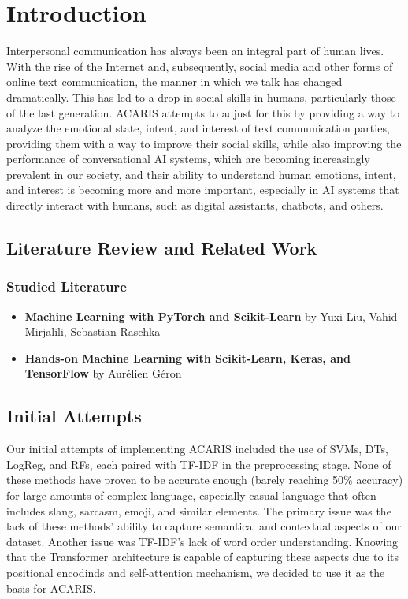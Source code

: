 \documentclass{article}
\begin{document}
\section{Introduction}
Interpersonal communication has always been an integral part of human lives. With the rise of the Internet and, subsequently, social media and other forms of online text communication, the manner in which we talk has changed dramatically. This has led to a drop in social skills in humans, particularly those of the last generation. ACARIS attempts to adjust for this by providing a way to analyze the emotional state, intent, and interest of text communication parties, providing them with a way to improve their social skills, while also improving the performance of conversational AI systems, which are becoming increasingly prevalent in our society, and their ability to understand human emotions, intent, and interest is becoming more and more important, especially in AI systems that directly interact with humans, such as digital assistants, chatbots, and others.

\subsection{Literature Review and Related Work}
\subsubsection{Studied Literature}
\begin{itemize}
	\item \textbf{Machine Learning with PyTorch and Scikit-Learn}\cite{raschka2022machine} by Yuxi Liu, Vahid Mirjalili, Sebastian Raschka
	\item \textbf{Hands-on Machine Learning with Scikit-Learn, Keras, and TensorFlow}\cite{geron2022hands} by Aurélien Géron
\end{itemize}

\subsection{Initial Attempts}
Our initial attempts of implementing ACARIS included the use of SVMs, DTs, LogReg, and RFs, each paired with TF-IDF in the preprocessing stage. None of these methods have proven to be accurate enough (barely reaching 50\% accuracy) for large amounts of complex language, especially casual language that often includes slang, sarcasm, emoji, and similar elements. The primary issue was the lack of these methods' ability to capture semantical and contextual aspects of our dataset. Another issue was TF-IDF's lack of word order understanding. Knowing that the Transformer\cite{vaswani2017attention} architecture is capable of capturing these aspects due to its positional encodinds and self-attention mechanism, we decided to use it as the basis for ACARIS.
\end{document}
